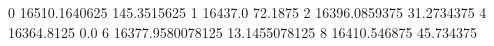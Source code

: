 0 16510.1640625 145.3515625
1 16437.0 72.1875
2 16396.0859375 31.2734375
4 16364.8125 0.0
6 16377.9580078125 13.1455078125
8 16410.546875 45.734375
